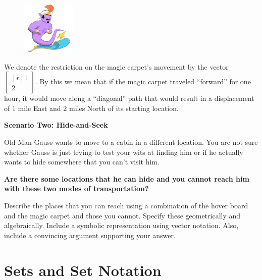 \documentclass{problemset}
\newcommand{\mat}[1]{\begin{bmatrix*}[r]#1\end{bmatrix*}}
\begin{document}
\begin{minipage}{\textwidth}
	\vspace{.5cm}
	\begin{figure}
	\vspace{-.8cm}
	\includegraphics[width=1in]{images/MagicCarpet-small.png}
	\end{figure}

	We denote the restriction on the magic carpet's movement by the vector
	$\mat{1 \\2 }$. By this we mean that if the
	magic carpet traveled ``forward'' for one hour, it would move along a
	``diagonal'' path that would result in a displacement of 1 mile East and
	2 miles North of its starting location.
	\vspace{1cm}
\end{minipage}



\textbf{Scenario Two: Hide-and-Seek}

Old Man Gauss wants to move to a cabin in a different location. You are
not sure whether Gauss is just trying to test your wits at finding him
or if he actually wants to hide somewhere that you can't visit him.

\vspace{5mm}

\textbf{Are there some locations that he can hide and you cannot reach him
with these two modes of transportation?}

Describe the places that you
can reach using a combination of the hover board and the magic carpet and
those you cannot. Specify these geometrically and algebraically. Include
a symbolic representation using vector notation. Also, include a convincing
argument supporting your answer.





\newpage
\pagestyle{siefken}


\section*{Sets and Set Notation}
\vspace{-.5cm}
\end{document}
